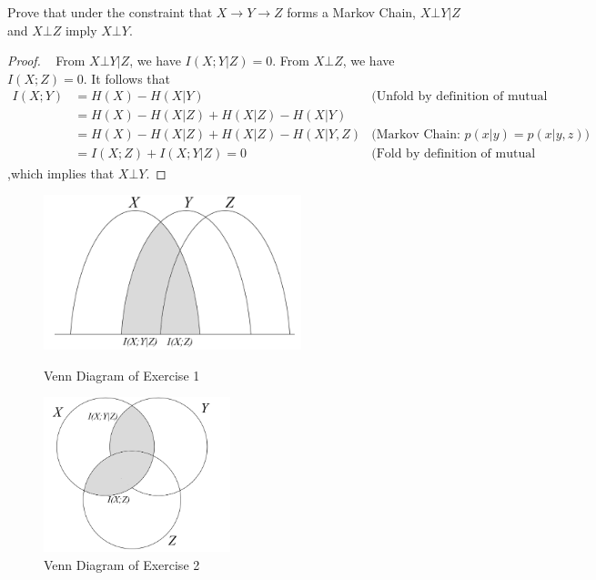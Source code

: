\begin{exercise}[]{Prove that under the constraint that $X\rightarrow Y \rightarrow Z$ forms a Markov Chain, $X\bot Y | Z$ and $X\bot Z$ imply $X\bot Y$}.
\begin{proof}
  \par{~}
  From $X\bot Y | Z$, we have $I(X;Y|Z)=0$. From $X\bot Z$, we have $I(X;Z)=0$. It follows that 
  \begin{equation}
    \begin{array}{rll}
      I(X;Y) &= H(X) - H(X|Y) &\text{(Unfold by definition of mutual information)}\\[2mm]
      &= H(X) - H(X|Z) + H(X|Z) - H(X|Y) & \\[2mm]
      &= H(X) - H(X|Z) + H(X|Z) - H(X|Y,Z) &\text{(Markov Chain: } p(x|y) = p(x|y,z) \text{)} \\[2mm]
      &= I(X;Z) + I(X;Y|Z) = 0 &\text{(Fold by definition of mutual information)} 
    \end{array}
  \end{equation}
  ,which implies that $X \bot Y$.
\end{proof}
\label{ex3-1}
\end{exercise}


\begin{figure}[htbp]
  \centering
      \begin{minipage}[t]{0.45\linewidth}
          \centering
          \includegraphics[height=4.5cm]{img/3-1.png}
          \caption{Venn Diagram of Exercise 1}
          \label{fig:ex1}
      \end{minipage}
      \begin{minipage}[t]{0.45\linewidth}
          \centering
          \includegraphics[height=4.5cm]{img/3-2.png}
          \caption{Venn Diagram of Exercise 2}
          \label{fig:ex2}
      \end{minipage}
\end{figure}


